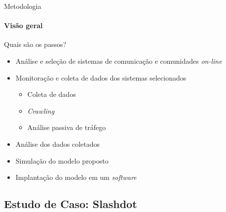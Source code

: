 \documentclass[compress]{beamer}
\begin{document}
    \begin{frame}{Metodologia}
    \framesubtitle{Visão geral}
        Quais são os passos?
        \begin{itemize}
            \item Análise e seleção de sistemas de comunicação e
            comunidades \emph{on-line}
            \pause

            \item Monitoração e coleta de dados dos sistemas
            selecionados
            \begin{itemize}
                \item Coleta de dados
                \item \emph{Crawling}
                \item Análise passiva de tráfego
            \end{itemize}
            \pause

            \item Análise dos dados coletados
            \pause

            \item Simulação do modelo proposto
            \pause

            \item Implantação do modelo em um \emph{software}
        \end{itemize}
    \end{frame}

\subsection{Estudo de Caso: Slashdot}
\end{document}
